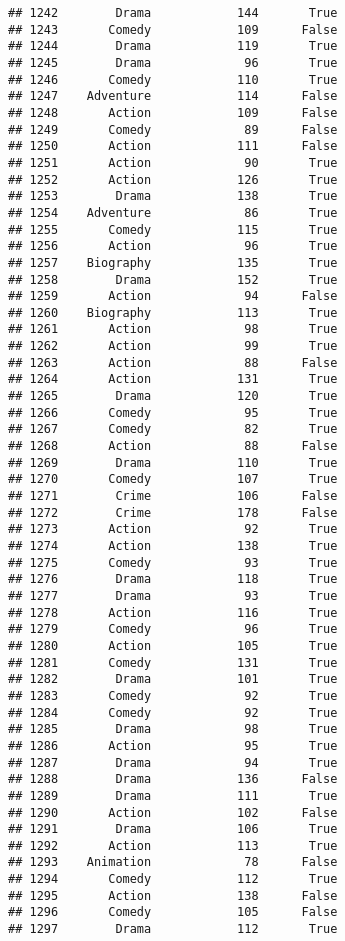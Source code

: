 \documentclass[
]{article}
\begin{document}
\begin{verbatim}
## 1242        Drama            144       True
## 1243       Comedy            109      False
## 1244        Drama            119       True
## 1245        Drama             96       True
## 1246       Comedy            110       True
## 1247    Adventure            114      False
## 1248       Action            109      False
## 1249       Comedy             89      False
## 1250       Action            111      False
## 1251       Action             90       True
## 1252       Action            126       True
## 1253        Drama            138       True
## 1254    Adventure             86       True
## 1255       Comedy            115       True
## 1256       Action             96       True
## 1257    Biography            135       True
## 1258        Drama            152       True
## 1259       Action             94      False
## 1260    Biography            113       True
## 1261       Action             98       True
## 1262       Action             99       True
## 1263       Action             88      False
## 1264       Action            131       True
## 1265        Drama            120       True
## 1266       Comedy             95       True
## 1267       Comedy             82       True
## 1268       Action             88      False
## 1269        Drama            110       True
## 1270       Comedy            107       True
## 1271        Crime            106      False
## 1272        Crime            178      False
## 1273       Action             92       True
## 1274       Action            138       True
## 1275       Comedy             93       True
## 1276        Drama            118       True
## 1277        Drama             93       True
## 1278       Action            116       True
## 1279       Comedy             96       True
## 1280       Action            105       True
## 1281       Comedy            131       True
## 1282        Drama            101       True
## 1283       Comedy             92       True
## 1284       Comedy             92       True
## 1285        Drama             98       True
## 1286       Action             95       True
## 1287        Drama             94       True
## 1288        Drama            136      False
## 1289        Drama            111       True
## 1290       Action            102      False
## 1291        Drama            106       True
## 1292       Action            113       True
## 1293    Animation             78      False
## 1294       Comedy            112       True
## 1295       Action            138      False
## 1296       Comedy            105      False
## 1297        Drama            112       True

\end{verbatim}
\end{document}
